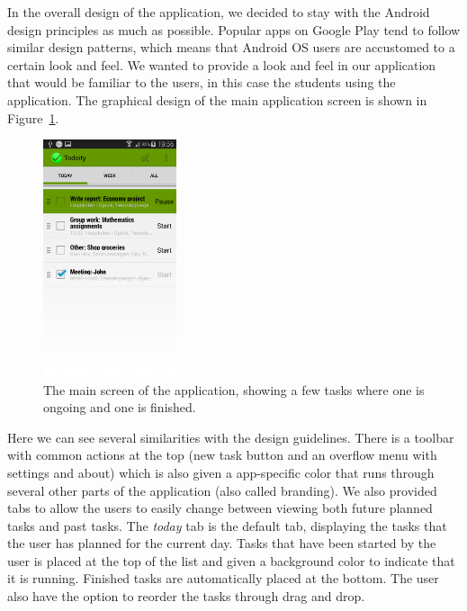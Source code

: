 In the overall design of the application, we decided to stay with the Android design principles\cite{androiddesign} as much as possible. Popular apps on Google Play tend to follow similar design patterns, which means that Android OS users are accustomed to a certain look and feel. We wanted to provide a look and feel in our application that would be familiar to the users, in this case the students using the application. The graphical design of the main application screen is shown in Figure~\ref{fig:designmainscreen}.
\begin{figure}[tbp]
  \centering
  \includegraphics[width=0.35\textwidth]{figures/MainScreenStarted.png}
  \caption[Main application screen]{The main screen of the application, showing a few tasks where one is ongoing and one is finished.}
  \label{fig:designmainscreen}
\end{figure}
Here we can see several similarities with the design guidelines. There is a toolbar with common actions at the top (new task button and an overflow menu with settings and about) which is also given a app-specific color that runs through several other parts of the application (also called branding). We also provided tabs to allow the users to easily change between viewing both future planned tasks and past tasks. The \emph{today} tab is the default tab, displaying the tasks that the user has planned for the current day. Tasks that have been started by the user is placed at the top of the list and given a background color to indicate that it is running. Finished tasks are automatically placed at the bottom. The user also have the option to reorder the tasks through drag and drop.

